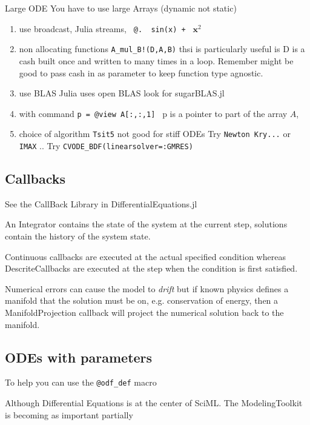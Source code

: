  
 
 Large ODE  You have to use large Arrays (dynamic not static)
 
 \begin{enumerate}
 \item  use broadcast, Julia streams,   \verb| @.  sin(x) + | $\mathbf x^2$ 
 
 \item non allocating functions  \verb|A_mul_B!(D,A,B)|  thsi is particularly useful is D is a cash built once and written to many times in a loop. Remember might be good to pass cash in as parameter to keep function type agnostic.
 \item use BLAS  Julia uses open BLAS  look for sugarBLAS.jl
 \item with command  \verb|p = @view A[:,:,1] | p is a pointer to  part of the array $A$, 
 
 \item choice of algorithm  \verb|Tsit5| not good for stiff ODEs  Try \verb|Newton Kry...| or \verb|IMAX| .. Try \verb|CVODE_BDF(linearsolver=:GMRES)|
 \end{enumerate}


 
 \subsection{Callbacks} See the CallBack Library in DifferentialEquations.jl
 
 An Integrator contains the state of the system at the current step, solutions contain the history of the system state.
 
  Continuous callbacks are executed at  the actual specified condition whereas DescriteCallbacks are executed at the step when the condition is first satisfied.
  
 Numerical errors can cause the model to \emph{drift} but if known physics defines a manifold that the solution must be on, e.g. conservation of energy, then a ManifoldProjection callback will  project the numerical solution back to the manifold.
 
 \subsection{ODEs with parameters}
 
 To help you can use the \verb#@odf_def# macro 
 
Although Differential Equations is at the center of SciML. The ModelingToolkit is becoming as important partially 
